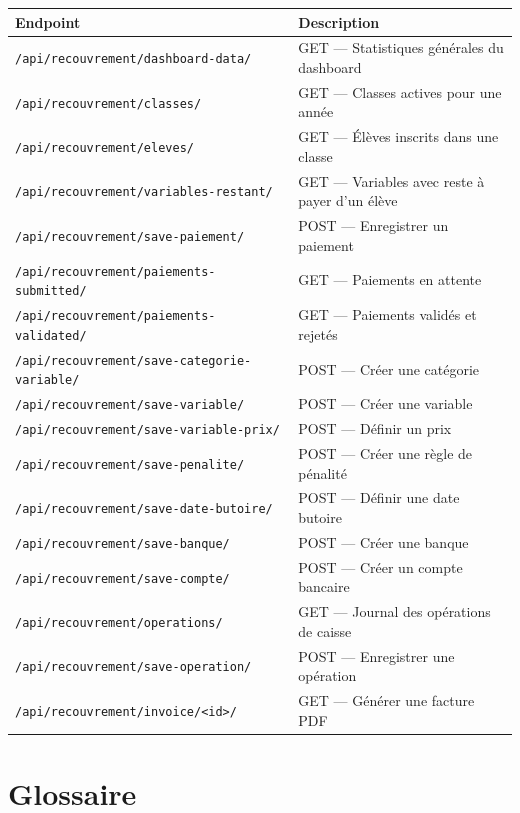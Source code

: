 {\small
\begin{tabularx}{\textwidth}{lX}
\toprule
\textbf{Endpoint} & \textbf{Description} \\
\midrule
\texttt{/api/recouvrement/dashboard-data/} & GET --- Statistiques g\'en\'erales du dashboard \\
\texttt{/api/recouvrement/classes/} & GET --- Classes actives pour une ann\'ee \\
\texttt{/api/recouvrement/eleves/} & GET --- \'El\`eves inscrits dans une classe \\
\texttt{/api/recouvrement/variables-restant/} & GET --- Variables avec reste \`a payer d'un \'el\`eve \\
\texttt{/api/recouvrement/save-paiement/} & POST --- Enregistrer un paiement \\
\texttt{/api/recouvrement/paiements-submitted/} & GET --- Paiements en attente \\
\texttt{/api/recouvrement/paiements-validated/} & GET --- Paiements valid\'es et rejet\'es \\
\texttt{/api/recouvrement/save-categorie-variable/} & POST --- Cr\'eer une cat\'egorie \\
\texttt{/api/recouvrement/save-variable/} & POST --- Cr\'eer une variable \\
\texttt{/api/recouvrement/save-variable-prix/} & POST --- D\'efinir un prix \\
\texttt{/api/recouvrement/save-penalite/} & POST --- Cr\'eer une r\`egle de p\'enalit\'e \\
\texttt{/api/recouvrement/save-date-butoire/} & POST --- D\'efinir une date butoire \\
\texttt{/api/recouvrement/save-banque/} & POST --- Cr\'eer une banque \\
\texttt{/api/recouvrement/save-compte/} & POST --- Cr\'eer un compte bancaire \\
\texttt{/api/recouvrement/operations/} & GET --- Journal des op\'erations de caisse \\
\texttt{/api/recouvrement/save-operation/} & POST --- Enregistrer une op\'eration \\
\texttt{/api/recouvrement/invoice/<id>/} & GET --- G\'en\'erer une facture PDF \\
\bottomrule
\end{tabularx}
}

\section{Glossaire}

